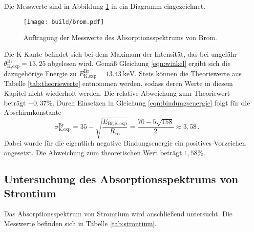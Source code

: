 Die Messwerte sind in Abbildung \ref{fig:brom} in ein Diagramm eingezeichnet.

\begin{figure}
  \centering
  \texttt{[image: build/brom.pdf]}
  \caption{Auftragung der Messwerte des Absorptionsspektrums von Brom.}
  \label{fig:brom}
\end{figure}

Die K-Kante befindet sich bei dem Maximum der Intensität, das bei ungefähr
$\theta_{\text{K,exp}}^{\text{Br}} = 13{,}25$ abgelesen wird. Gemäß Gleichung \eqref{eqn:winkel} ergibt sich die dazugehörige Energie
zu $E_{\text{K,exp}}^{\text{Br}} = \SI{13.43}{\kilo\electronvolt}$.
Stets können die Theoriewerte aus Tabelle \ref{tab:theoriewerte} entnommen werden,
sodass deren Werte in diesem Kapitel nicht wiederholt werden. Die relative Abweichung zum Theoriewert
beträgt $-0{,}37\%$. Durch Einsetzen in Gleichung \eqref{eqn:bindungsenergie}
folgt für die Abschirmkonstante
\begin{equation*}
  \sigma_{\text{K,exp}}^{\text{Br}} =  35 - \sqrt{\frac{E_{\text{Br,K,exp}}}{R_\infty}} = \frac{70-5\sqrt{158}}{2} \approx 3{,}58\,.
\end{equation*}
Dabei wurde für die eigentlich negative Bindungsenergie ein positives Vorzeichen angesetzt.
Die Abweichung zum theoretischen Wert beträgt $1{,}58\%$.

\subsection{Untersuchung des Absorptionsspektrums von Strontium}
\label{subsec:strontium}

Das Absorptionsspektrum von Stromtium wird anschließend untersucht.
Die Messwerte befinden sich in Tabelle \ref{tab:strontium}.

